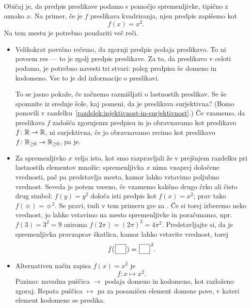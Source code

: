                 Običaj je, da predpis preslikave podamo s pomočjo spremenljivke, tipično z oznako $x$. Na primer, če je $f$ preslikava kvadriranja, njen predpis zapišemo kot
                \[f(x) = x^2.\]
                Na tem mestu je potrebno poudariti več reči.
                \begin{itemize}
                        \item
                                Velikokrat površno rečemo, da zgornji predpis podaja preslikavo. To ni povsem res --- to je zgolj predpis preslikave. Za to, da preslikavo v celoti podamo, je potrebno navesti tri stvari: poleg predpisa še domeno in kodomeno. Vse to je del informacije o preslikavi.

                                To se jasno pokaže, če začnemo razmišljati o lastnostih preslikav. Se še spomnite iz srednje šole, kaj pomeni, da je preslikava surjektivna? (Bomo ponovili v razdelku~\ref{razdelek:injektivnost-in-surjektivnost}.) Če vzamemo, da preslikava $f$ zadošča zgornjemu predpisu in jo obravnavamo kot preslikavo $f\colon \mathbb{R} \to \mathbb{R}$, ni surjektivna, če jo obravnavamo recimo kot preslikavo $f\colon \mathbb{R}_{\geq 0} \to \mathbb{R}_{\geq 0}$, pa je.
                        \item
                                Za spremenljivko $x$ velja isto, kot smo razpravljali že v prejšnjem razdelku pri lastnostih elementov množic: spremenljivka $x$ nima vnaprej določene vrednosti, pač pa predstavlja mesto, kamor lahko vstavimo poljubno vrednost. Seveda je potem vseeno, če vzamemo kakšno drugo črko ali čisto drug simbol: $f(y) = y^2$ določa isti predpis kot $f(x) = x^2$; prav tako $f(\sun) = \sun^2$. Se pravi, tudi v tem primeru gre za . Če si torej izberemo neko vrednost, jo lahko vstavimo na mesto spremenljivke in poračunamo, npr.~$f(3) = 3^2 = 9$ oziroma $f(2\pi) = (2\pi)^2 = 4\pi^2$. Predstavljajte si, da je spremenljivka pravzaprav škatlica, kamor lahko vstavite vrednost, torej
                                \[f(\argbox) = \argbox^2.\]
                        \item
                                Alternativen način zapisa $f(x) = x^2$ je
                                \[f\colon x \mapsto x^2.\]
                                Pazimo: navadna puščica $\to$ podaja domeno in kodomeno, kot razloženo zgoraj. Repata puščica $\mapsto$ pa za posamičen element domene pove, v kateri element kodomene se preslika.


\end{itemize}
